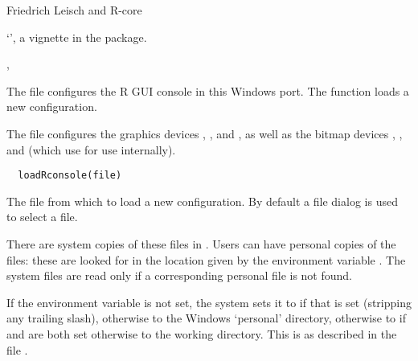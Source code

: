 %
\begin{Author}\relax
Friedrich Leisch and R-core
\end{Author}
%
\begin{SeeAlso}\relax
`', a vignette in
the  package.

, 
\end{SeeAlso}
%
\begin{Description}\relax
The file  configures the R GUI console in this
Windows port. The  function loads a new 
configuration.

The file  configures the graphics devices
, ,  and
, as well as the bitmap devices ,
,  and  (which use for  use  internally).
\end{Description}
%
\begin{Usage}
\begin{verbatim}
  loadRconsole(file)
\end{verbatim}
\end{Usage}
%
\begin{Arguments}
\begin{ldescription}
\item[\code{file}] The file from which to load a new  configuration.
By default a file dialog is used to select a file. 
\end{ldescription}
\end{Arguments}
%
\begin{Details}\relax
There are system copies of these files in
.  Users can have personal copies of
the files: these are looked for in the location given by the
environment variable . The system files are read only if a
corresponding personal file is not found.

If the environment variable  is not set, the \R{} system
sets it to  if that is set (stripping any trailing slash),
otherwise to the Windows `personal'  directory, 
otherwise to  if  and
 are both set
otherwise to the working directory.  This is as described in the file
.
\end{Details}
